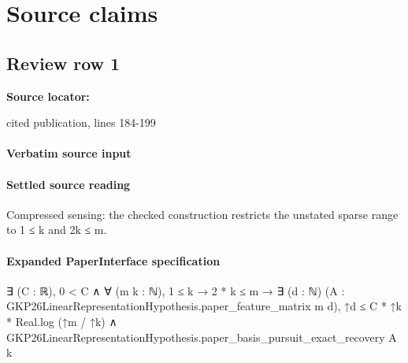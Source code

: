 \documentclass[10pt]{article}
\begin{document}
\clearpage
\hypertarget{source-claim-202b0f5354c0082d}{}
\hypertarget{source-section-f10b5f68e4acf3dc}{}
\section*{Source claims}
\subsection*{Review row 1}
\textbf{Source locator:} {\footnotesize\raggedright cited publication, lines 184-\allowbreak{}199\par}
\paragraph{Verbatim source input}

\paragraph{Settled source reading}
Compressed sensing: the checked construction restricts the unstated sparse range to 1 ≤ k and 2k ≤ m.

\paragraph{Expanded PaperInterface specification}
\begin{ReviewVerbatim}
∃ (C : ℝ),
  0 < C ∧
    ∀ (m k : ℕ),
      1 ≤ k →
        2 * k ≤ m →
          ∃ (d : ℕ) (A : GKP26LinearRepresentationHypothesis.paper_feature_matrix m d),
            ↑d ≤ C * ↑k * Real.log (↑m / ↑k) ∧
              GKP26LinearRepresentationHypothesis.paper_basis_pursuit_exact_recovery A k
\end{ReviewVerbatim}
\end{document}
